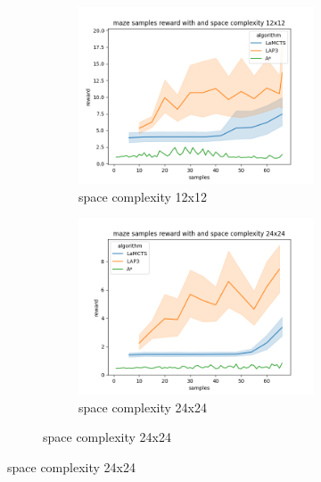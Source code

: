 \documentclass[bibliography=totoc]{scrartcl}
\begin{document}
\begin{figure}[H]
\begin{figure}[H]
	\centering
	\begin{subfigure}[b]{0.3\linewidth}
		\includegraphics[width=\linewidth]{img/maze_samples__reward_b_8_LAP3_MCTS_AStar_interrupted_12.png}
        \caption{space complexity 12x12}	
    \end{subfigure}
	\begin{subfigure}[b]{0.3\linewidth}
		\includegraphics[width=\linewidth]{img/maze_samples__reward_b_8_LAP3_MCTS_AStar_interrupted_24.png}
		\caption{space complexity 24x24}
	\end{subfigure}

\end{figure}
\end{figure}
\end{document}
